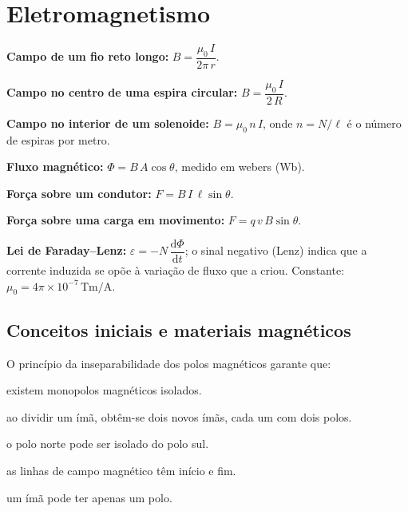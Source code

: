 \section{Eletromagnetismo}

\begin{conceito}
\textbf{Campo de um fio reto longo:}
$B = \dfrac{\mu_0\,I}{2\pi\,r}$.\par
\textbf{Campo no centro de uma espira circular:}
$B = \dfrac{\mu_0\,I}{2\,R}$.\par
\textbf{Campo no interior de um solenoide:}
$B = \mu_0\,n\,I$, onde $n = N/\ell$ é o número de espiras por metro.\par
\textbf{Fluxo magnético:} $\Phi = B\,A\cos\theta$, medido em webers (Wb).\par
\textbf{Força sobre um condutor:} $F = B\,I\,\ell\sin\theta$.\par
\textbf{Força sobre uma carga em movimento:} $F = q\,v\,B\sin\theta$.\par
\textbf{Lei de Faraday--Lenz:} $\varepsilon = -N\,\dfrac{\mathrm{d}\Phi}{\mathrm{d}t}$;
o sinal negativo (Lenz) indica que a corrente induzida se opõe à variação de fluxo
que a criou. Constante: $\mu_0 = 4\pi\times10^{-7}\,\si{\tesla\meter\per\ampere}$.
\end{conceito}

\legendaniveis

\subsection{Conceitos iniciais e materiais magnéticos}

\blocofixacao

\begin{questao}[1]{}
O princípio da inseparabilidade dos polos magnéticos garante que:
\begin{alternativas}
\item existem monopolos magnéticos isolados.
\item ao dividir um ímã, obtêm-se dois novos ímãs, cada um com dois polos.
\item o polo norte pode ser isolado do polo sul.
\item as linhas de campo magnético têm início e fim.
\item um ímã pode ter apenas um polo.
\end{alternativas}
\end{questao}

